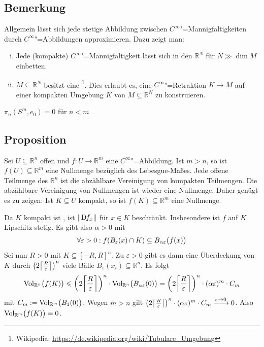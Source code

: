 \subsection[Bemerkung: Jede stetige Abbildung zwischen $C^\infty$"=Mfkt. ist approximierbar]{Bemerkung} %
\label{sub:174}
Allgemein lässt sich jede stetige Abbildung zwischen $C^\infty$"=Mannigfaltigkeiten durch $C^\infty$"=Abbildungen approximieren. Dazu zeigt man:
\begin{enumerate}[(i)]
	\item Jede (kompakte) $C^\infty$"=Mannigfaltigkeit lässt sich in den $\mathds{R}^N$ für $N \gg \dim M$ einbetten.
	\item $M \subseteq \mathds{R}^N$ besitzt eine \footnote{Wikipedia: \url{https://de.wikipedia.org/wiki/Tubulare_Umgebung}}. 
	Dies erlaubt es, eine $C^\infty$"=Retraktion $K \to M$ auf einer kompakten Umgebung $K$ von $M \subseteq \mathds{R}^N$ zu konstruieren.
\end{enumerate}
\begin{center}
	$\pi_n(S^m, e_0) = 0$ für $n <m$ 
\end{center}

\subsection[Proposition: Für $f : U \subseteq \mathds{R}^n \to \mathds{R}^m$, $m > n$ ist $f(U)$ eine Nullmenge]{Proposition} %
\label{sub:175}
Sei $U \subseteq \mathds{R}^n$ offen und $f : U \to \mathds{R}^m$ eine $C^\infty$"=Abbildung. Ist $m > n$, so ist $f(U) \subseteq \mathds{R}^m$ eine Nullmenge bezüglich
des Lebesgue-Maßes.
Jede offene Teilmenge des $\mathds{R}^n$ ist die abzählbare Vereinigung von kompakten Teilmengen. Die abzählbare Vereinigung von Nullmengen ist wieder eine Nullmenge. Daher
genügt es zu zeigen: Ist $K \subseteq U$ kompakt, so ist $f(K) \subseteq \mathds{R}^m$ eine Nullmenge. 

Da $K$ kompakt ist , ist $\norm{\D f_x} $ für $x \in K$ beschränkt. Insbesondere ist $f$ auf $K$ Lipschitz-stetig. Es gibt also $\alpha >0$ mit 
\[
	\forall \varepsilon > 0 : f \enbrace*{B_\varepsilon(x) \cap K} \subseteq B_{\alpha \varepsilon} \enbrace[\big]{f(x)}  
\]
Sei nun $R >0$ mit $K \subseteq [-R,R]^n$. Zu $\varepsilon>0$ gibt es dann eine Überdeckung von $K$ durch $\enbrace*{2 \ceil*{\frac{R}{\varepsilon}} }^n$ viele Bälle 
$B_\varepsilon(x_i) \subseteq \mathds{R}^n$. Es folgt 
\[
	\Vol_{\mathds{R}^n}\enbrace[\big]{f(K)} \le \enbrace*{2  \ceil*{\frac{R}{\varepsilon}}  }^n \cdot \Vol_{\mathds{R}^n} \enbrace[\big]{B_{\alpha \varepsilon}(0)} =   
	\enbrace*{2 \ceil*{\frac{R}{\varepsilon}}  }^n \cdot (\alpha \varepsilon)^m \cdot C_m
\]
mit $C_m := \Vol_{\mathds{R}^m} \enbrace[\big]{B_1(0)}$. Wegen $m >n$ gilt 
$\enbrace*{2 \ceil*{\frac{R}{\varepsilon}}  }^n \cdot (\alpha \varepsilon)^m \cdot C_m \xrightarrow{\varepsilon \to 0} 0 $.  Also 
$\Vol_{\mathds{R}^m} \enbrace[\big]{f(K)}=0$. \bewende

